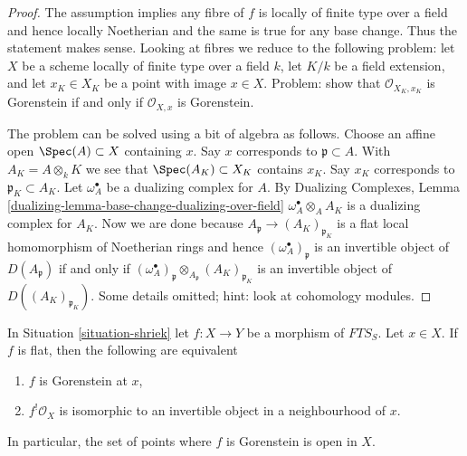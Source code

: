 \begin{proof}
The assumption implies any fibre of $f$ is locally of finite type
over a field and hence locally Noetherian and the same is true for
any base change. Thus the statement makes sense. Looking at
fibres we reduce to the following problem: let $X$ be a scheme
locally of finite type over a field $k$,
let $K/k$ be a field extension, and
let $x_K \in X_K$ be a point with image $x \in X$.
Problem: show that $\mathcal{O}_{X_K, x_K}$ is Gorenstein if and only if
$\mathcal{O}_{X, x}$ is Gorenstein.

\medskip\noindent
The problem can be solved using a bit of algebra as follows.
Choose an affine open $\Spec(A) \subset X$ containing $x$.
Say $x$ corresponds to $\mathfrak p \subset A$.
With $A_K = A \otimes_k K$ we see that $\Spec(A_K) \subset X_K$
contains $x_K$. Say $x_K$ corresponds to $\mathfrak p_K \subset A_K$.
Let $\omega_A^\bullet$ be a dualizing complex for $A$.
By Dualizing Complexes, Lemma
\ref{dualizing-lemma-base-change-dualizing-over-field}
$\omega_A^\bullet \otimes_A A_K$ is a dualizing complex for $A_K$.
Now we are done because
$A_\mathfrak p \to (A_K)_{\mathfrak p_K}$ is a flat local
homomorphism of Noetherian rings and hence
$(\omega_A^\bullet)_\mathfrak p$ is an invertible object
of $D(A_\mathfrak p)$ if and only if
$(\omega_A^\bullet)_\mathfrak p \otimes_{A_\mathfrak p} (A_K)_{\mathfrak p_K}$
is an invertible object of $D((A_K)_{\mathfrak p_K})$.
Some details omitted; hint: look at cohomology modules.
\end{proof}

\begin{lemma}
\label{lemma-affine-flat-Noetherian-gorenstein}
In Situation \ref{situation-shriek} let $f : X \to Y$ be a morphism
of $\textit{FTS}_S$. Let $x \in X$. If $f$ is flat, then
the following are equivalent
\begin{enumerate}
\item $f$ is Gorenstein at $x$,
\item $f^!\mathcal{O}_X$ is isomorphic to an invertible object
in a neighbourhood of $x$.
\end{enumerate}
In particular, the set of points where $f$ is Gorenstein is
open in $X$.
\end{lemma}

